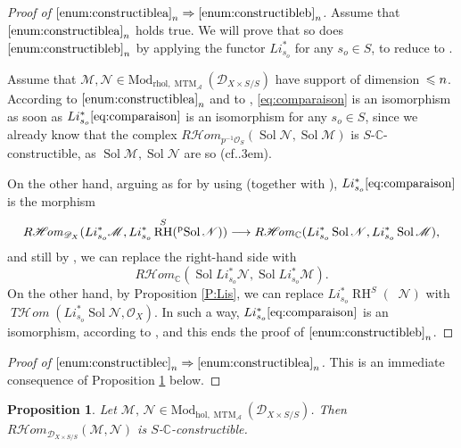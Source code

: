 \documentclass[english]{smfart}
\numberwithin{subsection}{section}
\def\sha{\mathcal{A}}\let\cA\sha
\def\shd{\mathcal{D}}\let\cD\shd
\def\shm{\mathcal{M}}
\def\shn{\mathcal{N}}\let\shn\shn
\def\sho{\mathcal{O}}\let\cO\sho
\newcommand{\C}{\mathbb{C}}\let\CC\C
\newcommand{\Rhom}{R\shhom}
\newcommand{\shhom}{\mathcal{H}\!\mathit{om}}\let\ho\shhom
\DeclareMathOperator{\tho}{\mathit{T}\shhom}
\DeclareMathOperator{\RH}{RH}
\newcommand{\hol}{\mathrm{hol}}
\newcommand{\rhol}{\mathrm{rhol}}
\newcommand{\Mod}{\mathrm{Mod}}
\newcommand{\XS}{X\times S}
\newcommand{\DXS}{\shd_{\XS/S}}
\DeclareMathOperator{\MTM}{MTM}
\DeclareMathOperator{\Sol}{Sol}
\DeclareMathOperator{\pSol}{{}^\mathrm{p}Sol}
\let\leq\leqslant
\def\cf{cf.\kern.3em}
\newcommand{\pOS}{p^{-1}\sho_S}
\numberwithin{equation}{section}
\theoremstyle{plain}
\newtheorem{proposition}[equation]{Proposition}
\theoremstyle{definition}
\def\to{\mathchoice{\longrightarrow}{\rightarrow}{\rightarrow}{\rightarrow}}
\def\implique{\mathchoice{\Longrightarrow}{\Rightarrow}{\Rightarrow}{\Rightarrow}}
\begin{document}
\begin{proof}[Proof of $\eqref{enum:constructiblea}_n\implique\eqref{enum:constructibleb}_n$]
Assume that $\eqref{enum:constructiblea}_n$ holds true. We will prove that so does $\eqref{enum:constructibleb}_n$ by applying the functor $Li_{s_o}^*$ for any $s_o\in S$, to reduce to \cite[Cor.\,8.6]{Kashiwara84}.

Assume that $\shm,\shn\in\Mod_{\rhol,\MTM_\sha}(\DXS)$ have support of dimension~$\leq\nobreak n$. Accor\-ding to $\eqref{enum:constructiblea}_n$ and to \cite[Prop.\,2.2]{MF-S12}, \eqref{eq:comparaison} is an isomorphism as soon as $Li_{s_o}^*\eqref{eq:comparaison}$ is an isomorphism for any $s_o\in S$, since we already know that the complex $\Rhom_{\pOS}(\Sol\shn,\Sol\shm)$ is $S$-$\CC$-constructible, as $\Sol\shm,\Sol\shn$ are so (\cf \cite[Th.\,3.7]{MF-S12}).

On the other hand, arguing as for \cite[Prop.\,2.1]{MF-S12} by using \cite[(A.10)]{Kashiwara03} (together with \cite[(2.6.7)]{K-S90}), $Li_{s_o}^*\eqref{eq:comparaison}$ is the morphism
\[
\Rhom_{\cD_X}(Li_{s_o}^*\shm, Li_{s_o}^*\RH^S(\pSol\shn))\to\Rhom_{\CC}(Li_{s_o}^*\Sol\shn,Li_{s_o}^*\Sol\shm),
\]
and still by \cite[Prop.\,2.1]{MF-S12}, we can replace the right-hand side with
\[
\Rhom_{\CC}(\Sol Li_{s_o}^*\shn,\Sol Li_{s_o}^*\shm).
\]
On the other hand, by Proposition \ref{P:Lis}, we can replace $Li_{s_o}^*\RH^S(\pSol\shn)$ with $\tho(Li_{s_o}^*\Sol\shn,\cO_X)$. In such a way, $Li_{s_o}^*\eqref{eq:comparaison}$ is an isomorphism, according to \cite[Cor.\,8.6]{Kashiwara84}, and this ends the proof of $\eqref{enum:constructibleb}_n$.
\end{proof}

\begin{proof}[Proof of $\eqref{enum:constructiblec}_n\implique\eqref{enum:constructiblea}_n$]
This is an immediate consequence of Proposition \ref{P:Theta5} below.
\end{proof}

\begin{proposition}\label{P:Theta5}
Let $\shm, \, \shn \in \Mod_{\hol,\MTM_\sha}(\DXS)$. Then $\Rhom_{\DXS}(\shm, \shn)$ is $S$-$\C$-constructible.
\end{proposition}
\end{document}
